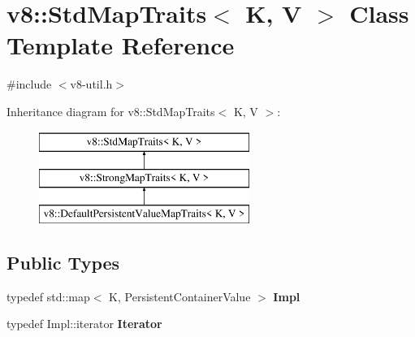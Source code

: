 \hypertarget{classv8_1_1_std_map_traits}{}\section{v8\+:\+:Std\+Map\+Traits$<$ K, V $>$ Class Template Reference}
\label{classv8_1_1_std_map_traits}


{\ttfamily \#include $<$v8-\/util.\+h$>$}

Inheritance diagram for v8\+:\+:Std\+Map\+Traits$<$ K, V $>$\+:\begin{figure}[H]
\begin{center}
\leavevmode
\includegraphics[height=3.000000cm]{classv8_1_1_std_map_traits}
\end{center}
\end{figure}
\subsection*{Public Types}
\begin{DoxyCompactItemize}
\item 
\hypertarget{classv8_1_1_std_map_traits_ac64cb78b3ef5cfbc35cf03837552e4ea}{}typedef std\+::map$<$ K, Persistent\+Container\+Value $>$ {\bfseries Impl}\label{classv8_1_1_std_map_traits_ac64cb78b3ef5cfbc35cf03837552e4ea}

\item 
\hypertarget{classv8_1_1_std_map_traits_ad20ef2022e83bfba6dcee23a2a34098e}{}typedef Impl\+::iterator {\bfseries Iterator}\label{classv8_1_1_std_map_traits_ad20ef2022e83bfba6dcee23a2a34098e}

\end{DoxyCompactItemize}
